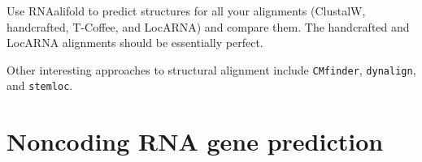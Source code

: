 \documentclass[a4paper]{article}
\renewcommand{\theenumi}{\alph{enumi}}
\renewcommand{\labelenumi}{(\theenumi)}
\renewcommand{\theenumii}{\Roman{enumii}}
\renewcommand{\labelenumii}{\theenumii.}
\begin{document}
Use RNAalifold to predict structures for all your alignments
(ClustalW, handcrafted, T-Coffee, and LocARNA) and compare them. The
handcrafted and LocARNA alignments should be essentially perfect.

Other interesting approaches to structural alignment include
\texttt{CMfinder}, \texttt{dynalign}, and \texttt{stemloc}.
















\section{Noncoding RNA gene prediction}
\end{document}
